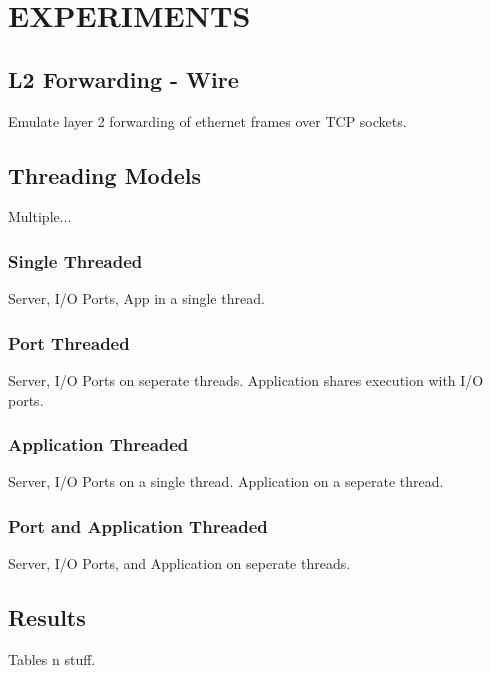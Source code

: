 \chapter{EXPERIMENTS}
\label{experiments}

\section{L2 Forwarding - Wire}
\label{experiments:wire}
Emulate layer 2 forwarding of ethernet frames over TCP sockets.

\section{Threading Models}
\label{experiments:models}
Multiple...

\subsection{Single Threaded}
\label{experiments:models-single}
Server, I/O Ports, App in a single thread.

\subsection{Port Threaded}
\label{experiments:models-port}
Server, I/O Ports on seperate threads. Application shares execution
with I/O ports.

\subsection{Application Threaded}
\label{experiments:models-app}
Server, I/O Ports on a single thread. Application on a seperate thread.

\subsection{Port and Application Threaded}
\label{experiments:models-port-app}
Server, I/O Ports, and Application on seperate threads.

\section{Results}
\label{experiments:results}
Tables n stuff.
